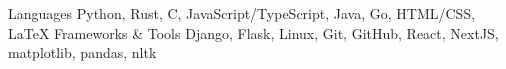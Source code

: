 

\begin{cvskills}

  \cvskill
    {Languages}
    {Python, Rust, C, JavaScript/TypeScript, Java, Go, HTML/CSS, LaTeX}
  \cvskill
    {Frameworks \& Tools}
    {Django, Flask, Linux, Git, GitHub, React, NextJS, matplotlib, pandas, nltk}
\end{cvskills}